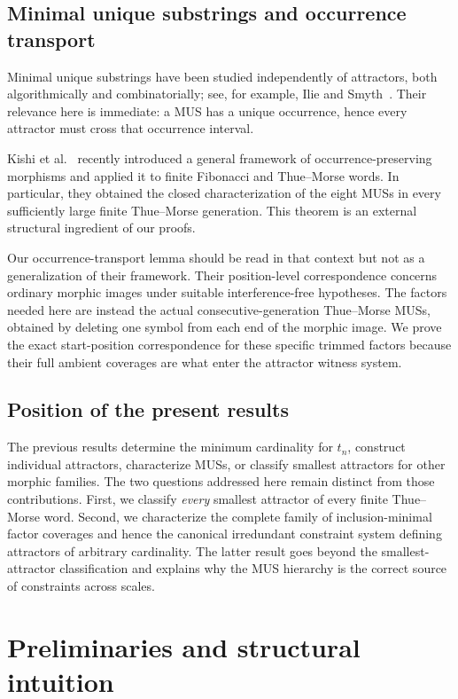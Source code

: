 \documentclass[11pt,a4paper]{article}
\theoremstyle{definition}\newtheorem{definition}[theorem]{Definition}
\theoremstyle{remark}\newtheorem{remark}[theorem]{Remark}
\begin{document}
\subsection{Minimal unique substrings and occurrence transport}
Minimal unique substrings have been studied independently of attractors, both algorithmically and combinatorially; see, for example, Ilie and Smyth~\cite{IlieSmyth2011}. Their relevance here is immediate: a MUS has a unique occurrence, hence every attractor must cross that occurrence interval.

Kishi et al.~\cite{Kishi2026} recently introduced a general framework of occurrence-preserving morphisms and applied it to finite Fibonacci and Thue--Morse words. In particular, they obtained the closed characterization of the eight MUSs in every sufficiently large finite Thue--Morse generation. This theorem is an external structural ingredient of our proofs.

Our occurrence-transport lemma should be read in that context but not as a generalization of their framework. Their position-level correspondence concerns ordinary morphic images under suitable interference-free hypotheses. The factors needed here are instead the actual consecutive-generation Thue--Morse MUSs, obtained by deleting one symbol from each end of the morphic image. We prove the exact start-position correspondence for these specific trimmed factors because their full ambient coverages are what enter the attractor witness system.

\subsection{Position of the present results}
The previous results determine the minimum cardinality for $t_n$, construct individual attractors, characterize MUSs, or classify smallest attractors for other morphic families. The two questions addressed here remain distinct from those contributions. First, we classify \emph{every} smallest attractor of every finite Thue--Morse word. Second, we characterize the complete family of inclusion-minimal factor coverages and hence the canonical irredundant constraint system defining attractors of arbitrary cardinality. The latter result goes beyond the smallest-attractor classification and explains why the MUS hierarchy is the correct source of constraints across scales.

\section{Preliminaries and structural intuition}
\label{sec:preliminaries}
\end{document}
